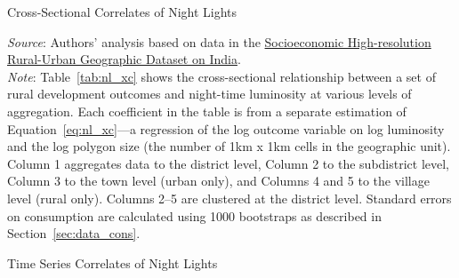 \documentclass[12pt,letterpaper]{article}
\newcommand{\shrugpath}{.}
\begin{document}
\begin{appendix}
\clearpage
\begin{landscape}
\begin{table}[H]
  \caption{Cross-Sectional Correlates of Night Lights} 

  \begin{center}
  \small{}
  \end{center}
  \footnotesize{\textit{Source}: Authors' analysis based on data in the
  \href{http://www.devdatalab.org/shrug}{Socioeconomic High-resolution
    Rural-Urban Geographic Dataset on India}. \\ \textit{Note}:
  Table~\ref{tab:nl_xc} shows the cross-sectional relationship between
  a set of rural development outcomes and night-time luminosity at
  various levels of aggregation. Each coefficient in the table is from
  a separate estimation of Equation~\ref{eq:nl_xc}---a regression of
  the log outcome variable on log luminosity and the log polygon size
  (the number of 1km x 1km cells in the geographic unit). Column 1
  aggregates data to the district level, Column 2 to the subdistrict
  level, Column 3 to the town level (urban only), and Columns 4 and 5
  to the village level (rural only). Columns 2--5 are
  clustered at the district level. Standard errors on consumption are
  calculated using 1000 bootstraps as described in
  Section~\ref{sec:data_cons}.}
  \label{tab:nl_xc}
\end{table}
\end{landscape}

\begin{landscape}
\begin{table}[H]
  \caption{Time Series Correlates of Night Lights} 
  

\end{table}
\end{landscape}
\end{appendix}
\end{document}
